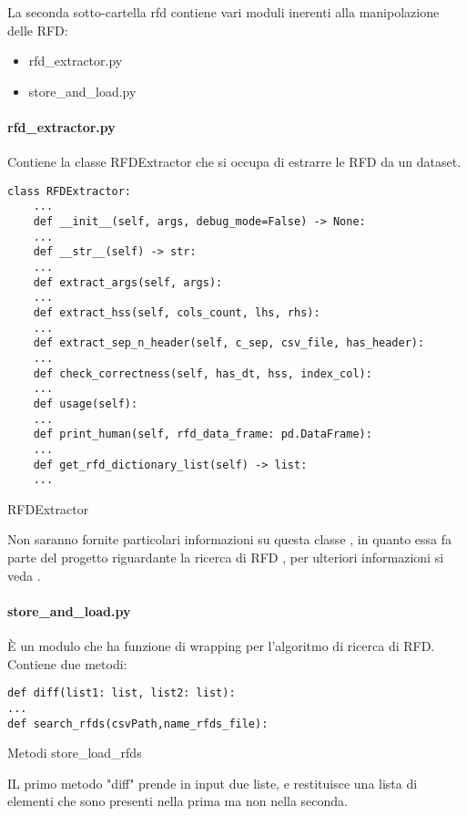 La seconda sotto-cartella rfd contiene vari moduli inerenti alla manipolazione delle RFD:
\begin{itemize}[noitemsep]
\let\labelitemi\labelitemii
    \item rfd{\_}extractor.py
    \item store{\_}and{\_}load.py
\end{itemize}

\paragraph{rfd{\_}extractor.py}
Contiene la classe RFDExtractor che si occupa di estrarre le RFD da un dataset.
\begin{listing}[H]
\begin{verbatim}
class RFDExtractor:
    ...
    def __init__(self, args, debug_mode=False) -> None:
    ...
    def __str__(self) -> str:
    ...
    def extract_args(self, args):
    ...
    def extract_hss(self, cols_count, lhs, rhs):
    ...
    def extract_sep_n_header(self, c_sep, csv_file, has_header):
    ...
    def check_correctness(self, has_dt, hss, index_col):
    ...
    def usage(self):
    ...
    def print_human(self, rfd_data_frame: pd.DataFrame):
    ...
    def get_rfd_dictionary_list(self) -> list:
    ...
\end{verbatim}
\caption{RFDExtractor}
\label{Code:6}
\end{listing}

Non saranno fornite particolari informazioni su questa classe , in quanto essa fa parte del progetto riguardante la ricerca di RFD , per ulteriori informazioni si veda \cite{tesinaIA}.

\paragraph{store{\_}and{\_}load.py}
È un modulo che ha funzione di wrapping per l'algoritmo di ricerca di RFD.
Contiene due metodi:
\begin{listing}[H]
\begin{verbatim}
def diff(list1: list, list2: list):
...
def search_rfds(csvPath,name_rfds_file):
\end{verbatim}
\caption{Metodi store{\_}load{\_}rfds}
\label{Code:7}
\end{listing}

IL primo metodo "diff" prende in input due liste, e restituisce una lista di elementi che sono presenti nella prima ma non nella seconda.

